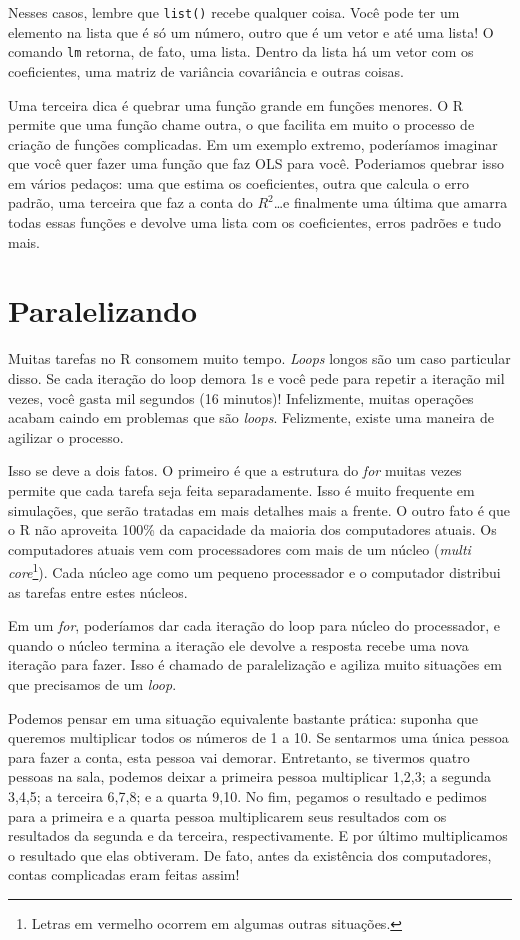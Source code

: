 \documentclass[]{book}
\let\rmarkdownfootnote\footnote%
\def\footnote{\protect\rmarkdownfootnote}
\begin{document}
Nesses casos, lembre que \texttt{list()} recebe qualquer coisa. Você
pode ter um elemento na lista que é só um número, outro que é um vetor e
até uma lista! O comando \texttt{lm} retorna, de fato, uma lista. Dentro
da lista há um vetor com os coeficientes, uma matriz de variância
covariância e outras coisas.

Uma terceira dica é quebrar uma função grande em funções menores. O R
permite que uma função chame outra, o que facilita em muito o processo
de criação de funções complicadas. Em um exemplo extremo, poderíamos
imaginar que você quer fazer uma função que faz OLS para você.
Poderiamos quebrar isso em vários pedaços: uma que estima os
coeficientes, outra que calcula o erro padrão, uma terceira que faz a
conta do \(R^2\)\ldots{}e finalmente uma última que amarra todas essas
funções e devolve uma lista com os coeficientes, erros padrões e tudo
mais.

\chapter{Paralelizando}\label{paralelizando}

Muitas tarefas no R consomem muito tempo. \emph{Loops} longos são um
caso particular disso. Se cada iteração do loop demora 1s e você pede
para repetir a iteração mil vezes, você gasta mil segundos (16 minutos)!
Infelizmente, muitas operações acabam caindo em problemas que são
\emph{loops}. Felizmente, existe uma maneira de agilizar o processo.

Isso se deve a dois fatos. O primeiro é que a estrutura do \emph{for}
muitas vezes permite que cada tarefa seja feita separadamente. Isso é
muito frequente em simulações, que serão tratadas em mais detalhes mais
a frente. O outro fato é que o R não aproveita 100\% da capacidade da
maioria dos computadores atuais. Os computadores atuais vem com
processadores com mais de um núcleo (\emph{multi core}\footnote{Letras
  em vermelho ocorrem em algumas outras situações.}). Cada núcleo age
como um pequeno processador e o computador distribui as tarefas entre
estes núcleos.

Em um \emph{for}, poderíamos dar cada iteração do loop para núcleo do
processador, e quando o núcleo termina a iteração ele devolve a resposta
recebe uma nova iteração para fazer. Isso é chamado de paralelização e
agiliza muito situações em que precisamos de um \emph{loop}.

Podemos pensar em uma situação equivalente bastante prática: suponha que
queremos multiplicar todos os números de 1 a 10. Se sentarmos uma única
pessoa para fazer a conta, esta pessoa vai demorar. Entretanto, se
tivermos quatro pessoas na sala, podemos deixar a primeira pessoa
multiplicar 1,2,3; a segunda 3,4,5; a terceira 6,7,8; e a quarta 9,10.
No fim, pegamos o resultado e pedimos para a primeira e a quarta pessoa
multiplicarem seus resultados com os resultados da segunda e da
terceira, respectivamente. E por último multiplicamos o resultado que
elas obtiveram. De fato, antes da existência dos computadores, contas
complicadas eram feitas assim!
\end{document}
